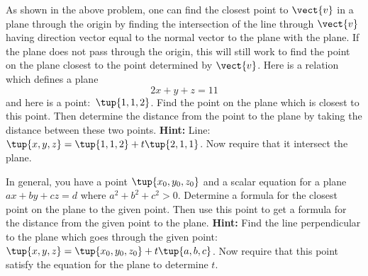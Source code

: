 \begin{enumialphparenastyle}
\begin{ex} As shown in the above problem, one can find the closest point to $\vect{v}$ in a plane through the origin by finding the intersection of the line
through $\vect{v}$ having direction vector equal to the normal vector to the
plane with the plane. If the plane does not pass through the origin, this
will still work to find the point on the plane closest to the point
determined by $\vect{v}$. Here is a relation which defines a plane 
\begin{equation*}
2x+y+z=11
\end{equation*}
and here is a point:\ $\tup{1,1,2} $. Find the point on the plane
which is closest to this point. Then determine the distance from the point
to the plane by taking the distance between these two points. \textbf{Hint: }
Line: $\tup{x,y,z} =\tup{1,1,2} +t\tup{2,1,1} $. Now
require that it intersect the plane. $\ $
\end{ex}

\begin{ex} In general, you have a point $\tup{x_{0},y_{0},z_{0}} $ and a
scalar equation for a plane $ax+by+cz=d$ where $a^{2}+b^{2}+c^{2}>0$.
Determine a formula for the closest point on the plane to the given point.
Then use this point to get a formula for the distance from the given point
to the plane. \textbf{Hint: }Find the line perpendicular to the plane which
goes through the given point: $\tup{x,y,z} =\tup{
x_{0},y_{0},z_{0}} +t\tup{a,b,c} $. Now require that this
point satisfy the equation for the plane to determine $t$.
\end{ex}

\end{enumialphparenastyle}